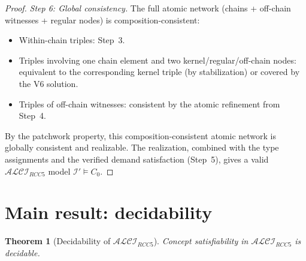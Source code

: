 \documentclass[a4paper,11pt]{article}
\newtheorem{theorem}{Theorem}[section]
\theoremstyle{definition}
\newcommand{\ALCIRCC}[1]{\ensuremath{\mathcal{ALCI}_{\mathit{RCC#1}}}}
\newcommand{\interp}{\ensuremath{\mathcal{I}}}
\begin{document}
\begin{proof}
\medskip\noindent\textit{Step 6: Global consistency.}\;
The full atomic network (chains + off-chain witnesses + regular nodes)
is composition-consistent:
\begin{itemize}
\item Within-chain triples: Step~3.
\item Triples involving one chain element and two
  kernel/regular/off-chain nodes: equivalent to the corresponding
  kernel triple (by stabilization) or covered by the V6 solution.
\item Triples of off-chain witnesses: consistent by the atomic
  refinement from Step~4.
\end{itemize}

By the patchwork property, this composition-consistent atomic network
is globally consistent and realizable.  The realization, combined with
the type assignments and the verified demand satisfaction (Step~5),
gives a valid $\ALCIRCC{5}$ model
$\interp' \models C_0$.
\end{proof}


\section{Main result: decidability}\label{sec:decidability}

\begin{theorem}[Decidability of $\ALCIRCC{5}$]
\label{thm:decidability}
Concept satisfiability in $\ALCIRCC{5}$ is decidable.
\end{theorem}
\end{document}
